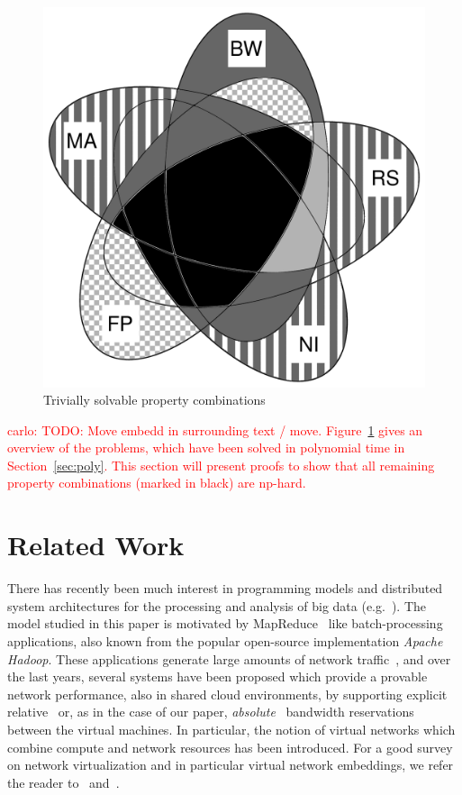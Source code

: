 \documentclass[9pt,twocolumn]{scrartcl}
\newcommand{\carlo}[1]{\textcolor{red}{carlo: #1}}
\begin{document}
\begin{figure}
\includegraphics[width=\columnwidth]{figs/venn_full.pdf}
\caption{Trivially solvable property combinations}
\label{fig:venn_full}
\end{figure}

\carlo{TODO: Move embedd in surrounding text / move. Figure~\ref{fig:venn_full}
gives an overview of the problems, which have been solved in polynomial time in
Section~\ref{sec:poly}. This section will present proofs to show that all
remaining property combinations (marked in black) are np-hard.}




\section{Related Work}\label{sec:relwork}

There has recently been much interest in programming models and distributed
system architectures for the processing and analysis of big data (e.g.~\cite{nodb,mapreduce,shark}). The model studied in
this paper is motivated by MapReduce~\cite{mapreduce} like batch-processing applications, also known
from the popular open-source implementation \emph{Apache Hadoop}.
These applications
generate large amounts of network traffic~\cite{orchestra,talk-about,amazonbw},
and over the last years, several systems have been proposed which provide
a provable network performance, also in shared cloud environments, by supporting explicit
relative~\cite{faircloud,elasticswitch,seawall}
or, as in the case of our paper, \emph{absolute}~\cite{oktopus,secondnet,drl,gatekeeper,proteus} bandwidth reservations
between the virtual machines.
In particular, the notion of virtual networks which combine compute and network resources has been introduced.
For a good survey on network virtualization and in particular virtual network embeddings,
we refer the reader to~\cite{boutaba-survey} and~\cite{fischer-survey}.
\end{document}
